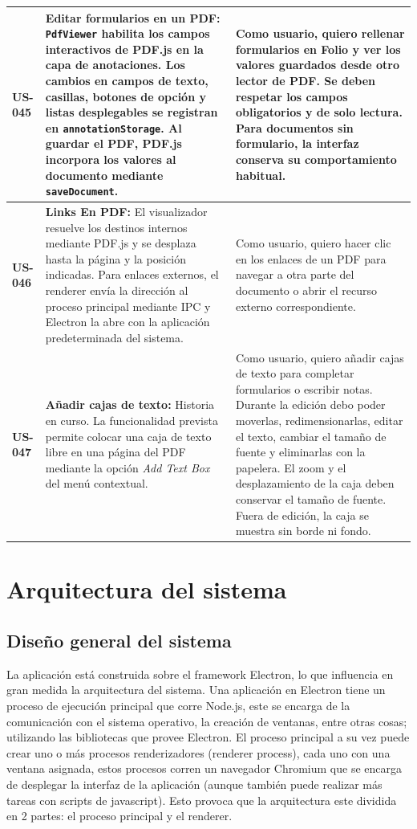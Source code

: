 \begin{longtable}{|l||p{7cm}|p{4.5cm}|}
\hline
\textbf{US-045} & \textbf{Editar formularios en un PDF:} \texttt{PdfViewer} habilita los campos interactivos de PDF.js en la capa de anotaciones. Los cambios en campos de texto, casillas, botones de opción y listas desplegables se registran en \texttt{annotationStorage}. Al guardar el PDF, PDF.js incorpora los valores al documento mediante \texttt{saveDocument}. & Como usuario, quiero rellenar formularios en Folio y ver los valores guardados desde otro lector de PDF. Se deben respetar los campos obligatorios y de solo lectura. Para documentos sin formulario, la interfaz conserva su comportamiento habitual.\\
\hline
\textbf{US-046} & \textbf{Links En PDF:} El visualizador resuelve los destinos internos mediante PDF.js y se desplaza hasta la página y la posición indicadas. Para enlaces externos, el renderer envía la dirección al proceso principal mediante IPC y Electron la abre con la aplicación predeterminada del sistema. & Como usuario, quiero hacer clic en los enlaces de un PDF para navegar a otra parte del documento o abrir el recurso externo correspondiente.\\
\hline
\textbf{US-047} & \textbf{Añadir cajas de texto:} Historia en curso. La funcionalidad prevista permite colocar una caja de texto libre en una página del PDF mediante la opción \emph{Add Text Box} del menú contextual. & Como usuario, quiero añadir cajas de texto para completar formularios o escribir notas. Durante la edición debo poder moverlas, redimensionarlas, editar el texto, cambiar el tamaño de fuente y eliminarlas con la papelera. El zoom y el desplazamiento de la caja deben conservar el tamaño de fuente. Fuera de edición, la caja se muestra sin borde ni fondo.\\
\hline

\end{longtable}

\chapter{Arquitectura del sistema}
\section{Diseño general del sistema}

La aplicación está construida sobre el framework Electron, lo que influencia en gran medida la arquitectura del sistema. Una aplicación en Electron\cite{electron_home} tiene un proceso de ejecución principal que corre Node.js, este se encarga de la comunicación con el sistema operativo, la creación de ventanas, entre otras cosas; utilizando las bibliotecas que provee Electron. El proceso principal a su vez puede crear uno o más procesos renderizadores (renderer process), cada uno con una ventana asignada, estos procesos corren un navegador Chromium que se encarga de desplegar la interfaz de la aplicación (aunque también puede realizar más tareas con scripts de javascript). Esto provoca que la arquitectura este dividida en 2 partes: el proceso principal y el renderer. \cite{electron_process_model}

